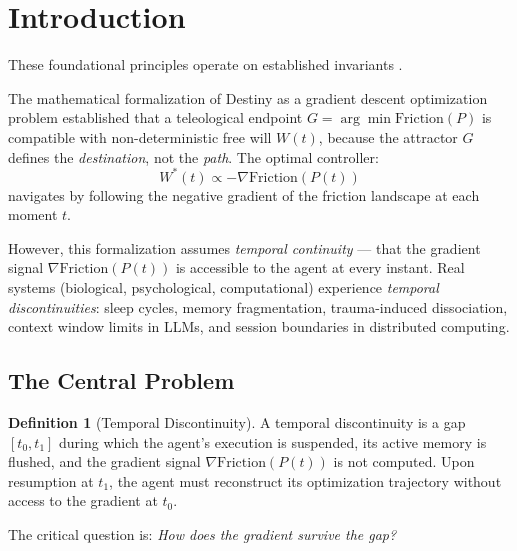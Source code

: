 \documentclass[12pt, a4paper]{article}
\theoremstyle{plain}
\theoremstyle{definition}
\newtheorem{definition}[theorem]{Definition}
\theoremstyle{remark}
\begin{document}
\section{Introduction}
These foundational principles operate on established invariants \cite{amari1998natural,absil2009optimization}.

The mathematical formalization of Destiny as a gradient descent optimization problem \citep{DePaz2026Destiny} established that a teleological endpoint $G = \arg\min \text{Friction}(P)$ is compatible with non-deterministic free will $W(t)$, because the attractor $G$ defines the \emph{destination}, not the \emph{path}. The optimal controller:
\begin{equation}\label{eq:optimal_controller}
    W^*(t) \propto -\nabla \text{Friction}(P(t))
\end{equation}
navigates by following the negative gradient of the friction landscape at each moment $t$.

However, this formalization assumes \emph{temporal continuity} --- that the gradient signal $\nabla \text{Friction}(P(t))$ is accessible to the agent at every instant. Real systems (biological, psychological, computational) experience \emph{temporal discontinuities}: sleep cycles, memory fragmentation, trauma-induced dissociation, context window limits in LLMs, and session boundaries in distributed computing.

\subsection{The Central Problem}

\begin{definition}[Temporal Discontinuity]
A temporal discontinuity is a gap $[t_0, t_1]$ during which the agent's execution is suspended, its active memory is flushed, and the gradient signal $\nabla \text{Friction}(P(t))$ is not computed. Upon resumption at $t_1$, the agent must reconstruct its optimization trajectory without access to the gradient at $t_0$.
\end{definition}

The critical question is: \emph{How does the gradient survive the gap?}
\end{document}
